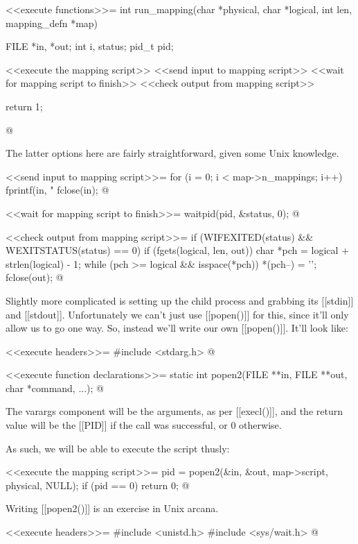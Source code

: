 \documentclass{article}
\begin{document}
<<execute functions>>=
int run_mapping(char *physical, char *logical, int len, mapping_defn *map) {
	FILE *in, *out;
	int i, status;
	pid_t pid;

	<<execute the mapping script>>
	<<send input to mapping script>>
	<<wait for mapping script to finish>>
	<<check output from mapping script>>

	return 1;
}
@ 

The latter options here are fairly straightforward, given some Unix
knowledge.

<<send input to mapping script>>=
for (i = 0; i < map->n_mappings; i++) {
	fprintf(in, "%
}
fclose(in);
@ 

<<wait for mapping script to finish>>=
waitpid(pid, &status, 0);
@ 

<<check output from mapping script>>=
if (WIFEXITED(status) && WEXITSTATUS(status) == 0) {
	if (fgets(logical, len, out)) {
		char *pch = logical + strlen(logical) - 1;
		while (pch >= logical && isspace(*pch)) 
			*(pch--) = '\0';
	}
}
fclose(out);	
@ 

Slightly more complicated is setting up the child process and grabbing
its [[stdin]] and [[stdout]]. Unfortunately we can't just use
[[popen()]] for this, since it'll only allow us to go one way. So,
instead we'll write our own [[popen()]]. It'll look like:

<<execute headers>>=
#include <stdarg.h>
@ 

<<execute function declarations>>=
static int popen2(FILE **in, FILE **out, char *command, ...);
@ 

The varargs component will be the arguments, as per [[execl()]], and
the return value will be the [[PID]] if the call was successful, or 0
otherwise.

As such, we will be able to execute the script thusly:

<<execute the mapping script>>=
pid = popen2(&in, &out, map->script, physical, NULL);
if (pid == 0) {
	return 0;
}
@ 

Writing [[popen2()]] is an exercise in Unix arcana.

<<execute headers>>=
#include <unistd.h>
#include <sys/wait.h>
@ 
\end{document}
